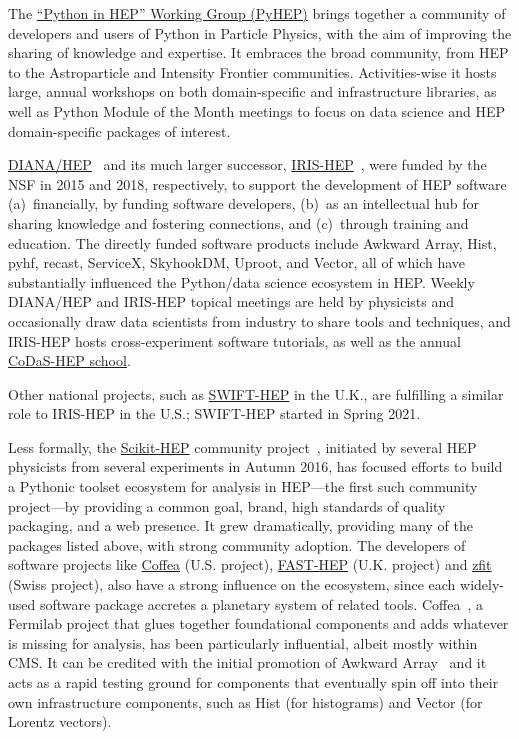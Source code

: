\documentclass[12pt,a4paper]{article}
\begin{document}
The \href{https://hepsoftwarefoundation.org/workinggroups/pyhep.html}{``Python in HEP'' Working Group (PyHEP)} brings together a community of developers and users of Python in Particle Physics, with the aim of improving the sharing of knowledge and expertise. It embraces the broad community, from HEP to the Astroparticle and Intensity Frontier communities. Activities-wise it hosts large, annual workshops on both domain-specific and infrastructure libraries, as well as Python Module of the Month meetings to focus on data science and HEP domain-specific packages of interest.

\href{http://diana-hep.org/}{DIANA/HEP}~\cite{DIANA/HEP} and its much larger successor, \href{https://iris-hep.org/}{IRIS-HEP}~\cite{IRIS-HEP}, were funded by the NSF in 2015 and 2018, respectively, to support the development of HEP software (a)~financially, by funding software developers, (b)~as an intellectual hub for sharing knowledge and fostering connections, and (c)~through training and education. The directly funded software products include Awkward Array, Hist, pyhf, recast, ServiceX, SkyhookDM, Uproot, and Vector, all of which have substantially influenced the Python/data science ecosystem in HEP. Weekly DIANA/HEP and IRIS-HEP topical meetings are held by physicists and occasionally draw data scientists from industry to share tools and techniques, and IRIS-HEP hosts cross-experiment software tutorials, as well as the annual \href{http://codas-hep.org/}{CoDaS-HEP school}.

Other national projects, such as \href{https://gtr.ukri.org/projects?ref=ST\%2FV002562\%2F1}{SWIFT-HEP} in the U.K., are fulfilling a similar role to IRIS-HEP in the U.S.;
SWIFT-HEP started in Spring 2021.

Less formally, the \href{https://scikit-hep.org/}{Scikit-HEP} community project~\cite{Rodrigues:2020syo}, initiated  by several HEP physicists from several experiments in Autumn 2016, has focused efforts to build a Pythonic toolset ecosystem for analysis in HEP---the first such community project---by providing a common goal, brand, high standards of quality packaging, and a web presence. It grew dramatically, providing many of the packages listed above, with strong community adoption. The developers of software projects like \href{https://coffeateam.github.io/coffea/}{Coffea} (U.S. project), \href{https://fast-hep.web.cern.ch/fast-hep/}{FAST-HEP} (U.K. project) and \href{https://zfit.readthedocs.io/en/latest/}{zfit} (Swiss project), also have a strong influence on the ecosystem, since each widely-used software package accretes a planetary system of related tools. Coffea~\cite{Smith:2020pxs}, a Fermilab project that glues together foundational components and adds whatever is missing for analysis, has been particularly influential,
albeit mostly within CMS. It can be credited with the initial promotion of Awkward Array~\cite{Pivarski:2020txo} and it acts as a rapid testing ground for components that eventually spin off into their own infrastructure components, such as Hist (for histograms) and Vector (for Lorentz vectors).
\end{document}

